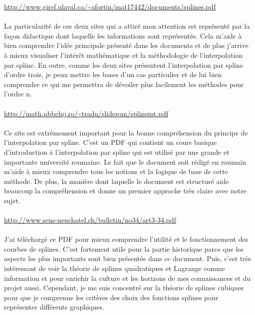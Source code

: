 \documentclass{article}
\begin{document}
{\color{blue}
\url{http://www.giref.ulaval.ca/~afortin/mat17442/documents/splines.pdf}}
\\\\ 
La particularit\'{e} de ces deux sites qui a attir\'{e} mon attention est repr\'{e}sent\'{e} par la fa\c{c}on didactique dont
laquelle les informations sont repr\'{e}sent\'{e}s. Cela m'aide \`{a} bien comprendre l'id\'{e}e principale pr\'{e}sent\'{e}
dans les documents et de plus j'arrive \`{a} mieux visualiser l'int\'{e}r\^{e}t math\'{e}matique et la m\'{e}thodologie
de l'interpolation par spline. En outre, comme les deux sites pr\'{e}sentent l'interpolation par spline
d'ordre trois, je peux mettre les bases d'un cas particulier et de lui bien comprendre ce qui me
permettra de d\'{e}voiler plus facilement les m\'{e}thodes pour l'ordre n.
\\\\
{\color{blue}
\url{http://math.ubbcluj.ro/~tradu/sliderom/splineint.pdf}}
\\\\ 
Ce site est extr\^{e}mement important pour la bonne compr\'{e}hension du principe de l'interpolation par
spline. C'est un PDF qui contient un cours basique d'introduction \`{a} l'interpolation par spline qui est
utilis\'{e} par une grande et importante universit\'{e} roumaine. Le fait que le document soit r\'{e}dig\'{e} en
roumain m'aide \`{a} mieux comprendre tous les notions et la logique de base de cette m\'{e}thode. De plus,
la mani\`{e}re dont laquelle le document est structur\'{e} aide beaucoup la compr\'{e}hension et donne un
premier approche tr\`{e}s claire avec notre sujet.
\\\\
{\color{blue}
\url{http://www.sens-neuchatel.ch/bulletin/no34/art3-34.pdf}}
\\\\ 
J'ai t\'{e}l\'{e}charg\'{e} ce PDF pour mieux comprendre l'utilit\'{e} et le fonctionnement des courbes de splines.
C'est fortement utile pour la partie historique parce que les aspects les plus importants sont bien
pr\'{e}sent\'{e}s dans ce document. Puis, c'est tr\`{e}s int\'{e}ressant de voir la th\'{e}orie de splines quadratiques et
Lagrange comme information et pour enrichir la culture et les horizons de mes connaissances et du
projet aussi. Cependant, je me suis concentr\'{e} sur la th\'{e}orie de splines cubiques pour que je
comprenne les crit\`{e}res des choix des fonctions splines pour repr\'{e}senter diff\'{e}rents graphiques.
\\\\
\end{document}
